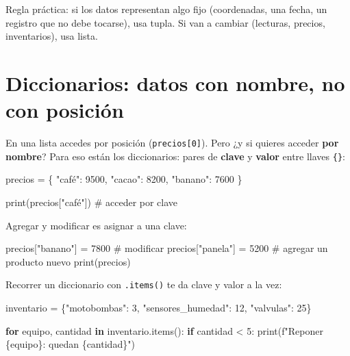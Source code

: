 \documentclass[
  spanish,
  letterpaper,
  DIV=11,
  numbers=noendperiod]{scrreprt}
\newenvironment{Shaded}{\begin{snugshade}}{\end{snugshade}}
\newcommand{\BuiltInTok}[1]{\textcolor[rgb]{0.00,0.23,0.31}{#1}}
\newcommand{\CommentTok}[1]{\textcolor[rgb]{0.37,0.37,0.37}{#1}}
\newcommand{\ControlFlowTok}[1]{\textcolor[rgb]{0.00,0.23,0.31}{\textbf{#1}}}
\newcommand{\DecValTok}[1]{\textcolor[rgb]{0.68,0.00,0.00}{#1}}
\newcommand{\KeywordTok}[1]{\textcolor[rgb]{0.00,0.23,0.31}{\textbf{#1}}}
\newcommand{\NormalTok}[1]{\textcolor[rgb]{0.00,0.23,0.31}{#1}}
\newcommand{\OperatorTok}[1]{\textcolor[rgb]{0.37,0.37,0.37}{#1}}
\newcommand{\SpecialCharTok}[1]{\textcolor[rgb]{0.37,0.37,0.37}{#1}}
\newcommand{\SpecialStringTok}[1]{\textcolor[rgb]{0.13,0.47,0.30}{#1}}
\newcommand{\StringTok}[1]{\textcolor[rgb]{0.13,0.47,0.30}{#1}}
\begin{document}
Regla práctica: si los datos representan algo fijo (coordenadas, una
fecha, un registro que no debe tocarse), usa tupla. Si van a cambiar
(lecturas, precios, inventarios), usa lista.

\section{Diccionarios: datos con nombre, no con
posición}\label{diccionarios-datos-con-nombre-no-con-posiciuxf3n}

En una lista accedes por posición (\texttt{precios{[}0{]}}). Pero ¿y si
quieres acceder \textbf{por nombre}? Para eso están los diccionarios:
pares de \textbf{clave} y \textbf{valor} entre llaves \texttt{\{\}}:

\begin{Shaded}
\begin{Highlighting}[]
\NormalTok{precios }\OperatorTok{=}\NormalTok{ \{}
    \StringTok{"café"}\NormalTok{: }\DecValTok{9500}\NormalTok{,}
    \StringTok{"cacao"}\NormalTok{: }\DecValTok{8200}\NormalTok{,}
    \StringTok{"banano"}\NormalTok{: }\DecValTok{7600}
\NormalTok{\}}

\BuiltInTok{print}\NormalTok{(precios[}\StringTok{"café"}\NormalTok{])   }\CommentTok{\# acceder por clave}
\end{Highlighting}
\end{Shaded}

Agregar y modificar es asignar a una clave:

\begin{Shaded}
\begin{Highlighting}[]
\NormalTok{precios[}\StringTok{"banano"}\NormalTok{] }\OperatorTok{=} \DecValTok{7800}      \CommentTok{\# modificar}
\NormalTok{precios[}\StringTok{"panela"}\NormalTok{] }\OperatorTok{=} \DecValTok{5200}      \CommentTok{\# agregar un producto nuevo}
\BuiltInTok{print}\NormalTok{(precios)}
\end{Highlighting}
\end{Shaded}

Recorrer un diccionario con \texttt{.items()} te da clave y valor a la
vez:

\begin{Shaded}
\begin{Highlighting}[]
\NormalTok{inventario }\OperatorTok{=}\NormalTok{ \{}\StringTok{"motobombas"}\NormalTok{: }\DecValTok{3}\NormalTok{, }\StringTok{"sensores\_humedad"}\NormalTok{: }\DecValTok{12}\NormalTok{, }\StringTok{"valvulas"}\NormalTok{: }\DecValTok{25}\NormalTok{\}}

\ControlFlowTok{for}\NormalTok{ equipo, cantidad }\KeywordTok{in}\NormalTok{ inventario.items():}
    \ControlFlowTok{if}\NormalTok{ cantidad }\OperatorTok{\textless{}} \DecValTok{5}\NormalTok{:}
        \BuiltInTok{print}\NormalTok{(}\SpecialStringTok{f"Reponer }\SpecialCharTok{\{}\NormalTok{equipo}\SpecialCharTok{\}}\SpecialStringTok{: quedan }\SpecialCharTok{\{}\NormalTok{cantidad}\SpecialCharTok{\}}\SpecialStringTok{"}\NormalTok{)}
\end{Highlighting}
\end{Shaded}
\end{document}
